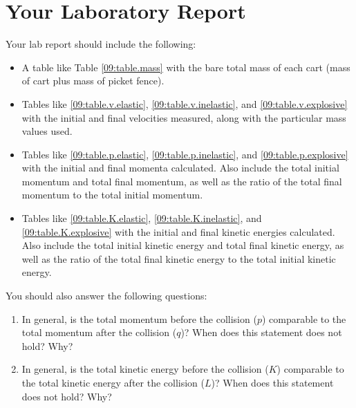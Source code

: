 \section{Your Laboratory Report}
%
Your lab report should include the following:
\begin{itemize}
    \item A table like Table \ref{09:table.mass} with the bare total mass of each cart (mass of cart plus mass of picket fence).
    \item Tables like \ref{09:table.v.elastic}, \ref{09:table.v.inelastic}, and \ref{09:table.v.explosive} with the initial and final velocities measured, along with the particular mass values used.
    \item Tables like \ref{09:table.p.elastic}, \ref{09:table.p.inelastic}, and \ref{09:table.p.explosive} with the initial and final momenta calculated. Also include the total initial momentum and total final momentum, as well as the ratio of the total final momentum to the total initial momentum.
    \item Tables like \ref{09:table.K.elastic}, \ref{09:table.K.inelastic}, and \ref{09:table.K.explosive} with the initial and final kinetic energies calculated. Also include the total initial kinetic energy and total final kinetic energy, as well as the ratio of the total final kinetic energy to the total initial kinetic energy.
\end{itemize}
You should also answer the following questions:
\begin{enumerate}
    \item In general, is the total momentum before the collision ($p$) comparable to the total momentum after the collision ($q$)? When does this statement does not hold? Why?
    \item In general, is the total kinetic energy before the collision ($K$) comparable to the total kinetic energy after the collision ($L$)? When does this statement does not hold? Why?
\end{enumerate}
%
\newpage

